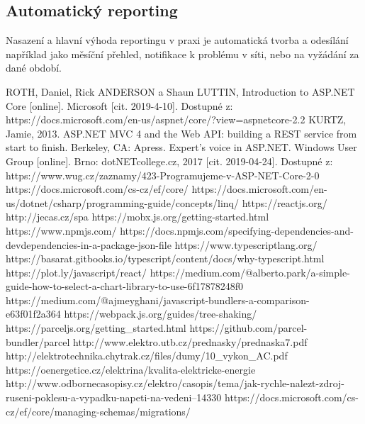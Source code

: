 \documentclass[FM,BP]{tulthesis}
\begin{document}
        \subsection*{Automatický reporting}
            Nasazení a hlavní výhoda reportingu v praxi je automatická tvorba a odesílání například jako měsíční přehled, 
            notifikace k problému v síti, nebo na vyžádání za dané období.


\begin{thebibliography}{Mm99}
        ROTH, Daniel, Rick ANDERSON a Shaun LUTTIN, Introduction to ASP.NET Core [online]. Microsoft [cit. 2019-4-10]. Dostupné z: https://docs.microsoft.com/en-us/aspnet/core/?view=aspnetcore-2.2
        KURTZ, Jamie, 2013. ASP.NET MVC 4 and the Web API: building a REST service from start to finish. Berkeley, CA: Apress. Expert's voice in ASP.NET.
        Windows User Group [online]. Brno: dotNETcollege.cz, 2017 [cit. 2019-04-24]. Dostupné z: https://www.wug.cz/zaznamy/423-Programujeme-v-ASP-NET-Core-2-0
    https://docs.microsoft.com/cs-cz/ef/core/
    https://docs.microsoft.com/en-us/dotnet/csharp/programming-guide/concepts/linq/
    https://reactjs.org/ 
    http://jecas.cz/spa 
    https://mobx.js.org/getting-started.html
    https://www.npmjs.com/ 
    https://docs.npmjs.com/specifying-dependencies-and-devdependencies-in-a-package-json-file 
    https://www.typescriptlang.org/ 
    https://basarat.gitbooks.io/typescript/content/docs/why-typescript.html 
    https://plot.ly/javascript/react/ 
    https://medium.com/@alberto.park/a-simple-guide-how-to-select-a-chart-library-to-use-6f17878248f0
    https://medium.com/@ajmeyghani/javascript-bundlers-a-comparison-e63f01f2a364 
    https://webpack.js.org/guides/tree-shaking/ 
    https://parceljs.org/getting{\_}started.html 
    https://github.com/parcel-bundler/parcel 
    http://www.elektro.utb.cz/prednasky/prednaska7.pdf 
    http://elektrotechnika.chytrak.cz/files/dumy/10{\_}vykon{\_}AC.pdf 
    https://oenergetice.cz/elektrina/kvalita-elektricke-energie 
    http://www.odbornecasopisy.cz/elektro/casopis/tema/jak-rychle-nalezt-zdroj-ruseni-poklesu-a-vypadku-napeti-na-vedeni--14330 
    https://docs.microsoft.com/cs-cz/ef/core/managing-schemas/migrations/

\end{thebibliography}
\end{document}
